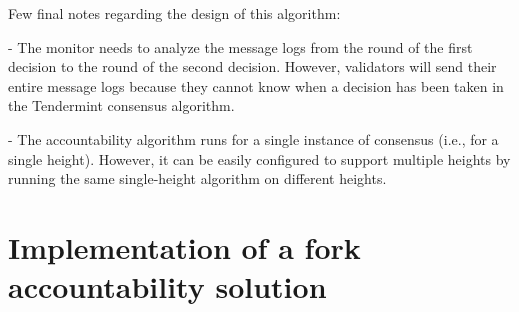 \documentclass[a4paper,11pt,oneside]{report}
\begin{document}
\begin{markdown}
Few final notes regarding the design of this algorithm:

- The monitor needs to analyze the message logs from the round of the first decision to the round of the second decision. However, validators will send their entire message logs because they cannot know when a decision has been taken in the Tendermint consensus algorithm. 

- The accountability algorithm runs for a single instance of consensus (i.e., for a single height). However, it can be easily configured to support multiple heights by running the same single-height algorithm on different heights. 

\end{markdown}

\chapter{Implementation of a fork accountability solution}
\end{document}
